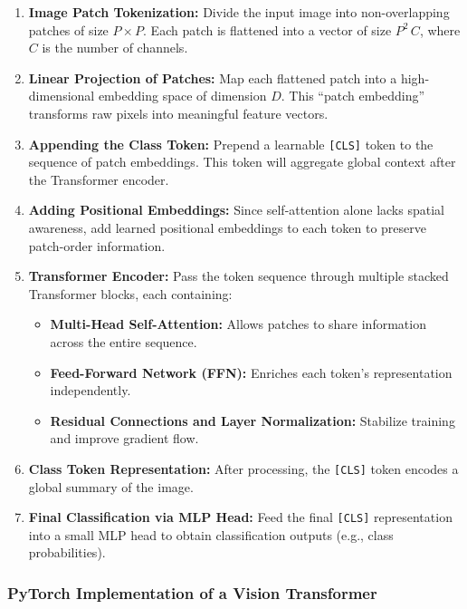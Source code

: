 \begin{enumerate}
    \item \textbf{Image Patch Tokenization:} 
    Divide the input image into non-overlapping patches of size \(P \times P\). Each patch is flattened into a vector of size \(P^2 \, C\), where \(C\) is the number of channels.
    
    \item \textbf{Linear Projection of Patches:}
    Map each flattened patch into a high-dimensional embedding space of dimension \(D\). This “patch embedding” transforms raw pixels into meaningful feature vectors.
    
    \item \textbf{Appending the Class Token:}
    Prepend a learnable \texttt{[CLS]} token to the sequence of patch embeddings. This token will aggregate global context after the Transformer encoder.
    
    \item \textbf{Adding Positional Embeddings:}
    Since self-attention alone lacks spatial awareness, add learned positional embeddings to each token to preserve patch-order information.
    
    \item \textbf{Transformer Encoder:}
    Pass the token sequence through multiple stacked Transformer blocks, each containing:
    \begin{itemize}
        \item \textbf{Multi-Head Self-Attention:} Allows patches to share information across the entire sequence.
        \item \textbf{Feed-Forward Network (FFN):} Enriches each token’s representation independently.
        \item \textbf{Residual Connections and Layer Normalization:} Stabilize training and improve gradient flow.
    \end{itemize}
    
    \item \textbf{Class Token Representation:}
    After processing, the \texttt{[CLS]} token encodes a global summary of the image.
    
    \item \textbf{Final Classification via MLP Head:}
    Feed the final \texttt{[CLS]} representation into a small MLP head to obtain classification outputs (e.g., class probabilities).
\end{enumerate}

\newpage
\subsubsection{PyTorch Implementation of a Vision Transformer}

